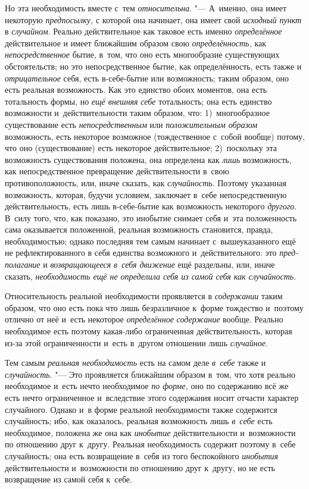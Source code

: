 Но эта необходимость вместе с~тем {\em относительна}. "---
А~именно, она имеет некоторую {\em предпосылку,} с
которой она начинает, она имеет свой {\em исходный
пункт} в {\em случайном}. Реально действительное как
таковое есть именно {\em определённое} действительное и
имеет ближайшим образом свою {\em определённость,} как
{\em непосредственное} бытие, в~том, что оно есть
многообразие существующих обстоятельств; но это непосредственное бытие, как
определённость, есть также и {\em отрицательное} себя,
есть в-себе-бытие или возможность; таким образом, оно есть реальная
возможность. Как это единство обоих моментов, она есть тотальность формы,
но {\em ещё внешняя} {\em себе}
тотальность; она есть единство возможности и~действительности таким
образом, что: 1)~многообразное существование есть
{\em непосредственным} или
{\em положительным образом} возможность, есть некоторое
возможное (тождественное с~собой вообще) потому, что оно (существование)
есть некоторое действительное; 2)~поскольку эта возможность существования
положена, она определена как {\em лишь} возможность,
как непосредственное превращение действительности в~свою противоположность,
или, иначе сказать, как {\em случайность}. Поэтому
указанная возможность, которая, будучи условием, заключает в~себе
непосредственную действительность, есть лишь в-себе-бытие как возможность
некоторого {\em другого}. В~силу того, что, как
показано, это инобытие снимает себя и~эта положенность сама оказывается
положенной, реальная возможность становится, правда, необходимостью; однако
последняя тем самым начинает с~вышеуказанного ещё не рефлектированного в
себя единства возможного и~действительного: это
{\em пред-полагание} и
{\em возвращающееся} {\em в~себя
движение} ещё раздельны, или, иначе сказать,
{\em необходимость ещё не определила себя из самой себя
как случайность}.

Относительность реальной необходимости проявляется в
{\em содержании} таким образом, что оно есть пока что
лишь безразличное к~форме тождество и~поэтому отлично от неё и~есть
некоторое {\em определённое}
{\em содержание} вообще. Реально необходимое есть
поэтому какая-либо ограниченная действительность, которая из-за этой
ограниченности и~есть в~другом отношении лишь
{\em случайное}.

Тем самым {\em реальная необходимость} есть на самом
деле {\em в~себе} также и
{\em случайность}. "--- Это проявляется ближайшим образом
в~том, что хотя реально необходимое и~есть нечто необходимое
{\em по форме,} оно по содержанию всё же есть нечто
ограниченное и~вследствие этого содержания носит отчасти характер
случайного. Однако и~в форме реальной необходимости также содержится
случайность; ибо, как оказалось, реальная возможность лишь
{\em в~себе} есть необходимое, положена же она как
{\em инобытие} действительности и~возможности по
отношению друг к~другу. Реальная необходимость содержит поэтому в~себе
случайность; она есть возвращение в~себя из того беспокойного
{\em инобытия} действительности и~возможности по
отношению друг к~другу, но не есть возвращение из самой себя к~себе.

